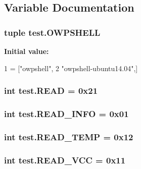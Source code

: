 \subsection{Variable Documentation}
\hypertarget{namespacetest_a16be3b8e62d4cb17a1b5bd413ea7a7cb}{
\subsubsection[{O\-W\-P\-S\-H\-E\-L\-L}]{\setlength{\rightskip}{0pt plus 5cm}tuple test.\-O\-W\-P\-S\-H\-E\-L\-L}}\label{namespacetest_a16be3b8e62d4cb17a1b5bd413ea7a7cb}
{\bfseries Initial value\-:}
\begin{DoxyCode}
1 = [\textcolor{stringliteral}{"owpshell"},
2             \textcolor{stringliteral}{"owpshell-ubuntu14.04"},]
\end{DoxyCode}
\hypertarget{namespacetest_a2ce8a5c40c782312e4064330f10e3703}{
\subsubsection[{R\-E\-A\-D}]{\setlength{\rightskip}{0pt plus 5cm}int test.\-R\-E\-A\-D = 0x21}}\label{namespacetest_a2ce8a5c40c782312e4064330f10e3703}
\hypertarget{namespacetest_ae3d92ee5a9adc4f30b4dbe11ddb40a21}{
\subsubsection[{R\-E\-A\-D\-\_\-\-I\-N\-F\-O}]{\setlength{\rightskip}{0pt plus 5cm}int test.\-R\-E\-A\-D\-\_\-\-I\-N\-F\-O = 0x01}}\label{namespacetest_ae3d92ee5a9adc4f30b4dbe11ddb40a21}
\hypertarget{namespacetest_a79f4ea0acd6b49713be24560c2a71f6a}{
\subsubsection[{R\-E\-A\-D\-\_\-\-T\-E\-M\-P}]{\setlength{\rightskip}{0pt plus 5cm}int test.\-R\-E\-A\-D\-\_\-\-T\-E\-M\-P = 0x12}}\label{namespacetest_a79f4ea0acd6b49713be24560c2a71f6a}
\hypertarget{namespacetest_a44e5ad39f0c147a2e71624be56e99d95}{
\subsubsection[{R\-E\-A\-D\-\_\-\-V\-C\-C}]{\setlength{\rightskip}{0pt plus 5cm}int test.\-R\-E\-A\-D\-\_\-\-V\-C\-C = 0x11}}\label{namespacetest_a44e5ad39f0c147a2e71624be56e99d95}
